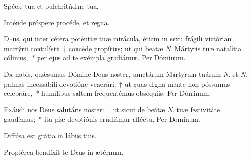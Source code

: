\documentclass[vesperale_romanum.tex]{subfiles}
\begin{document}

\newpage
\altertonus


\vel



\vv Spécie tua et pulchritúdine tua. \tpalleluia

\rr Inténde próspere procéde, et regna. \tpalleluia



\lettrine{D}{e}us, qui inter cétera poténtiæ tuæ mirácula, étiam in sexu frágili victóriam martýrii contulísti:~† concéde propítius; ut qui beatæ \textit{N.} Mártyris tuæ natalítia cólimus,~* per ejus ad te exémpla gradiámur. Per Dóminum.


\lettrine{D}{a} nobis, quǽsumus Dómine Deus noster, sanctárum Mártyrum tuárum \textit{N.} et \textit{N.} palmas incessábili devotióne venerári:~† ut quas digna mente non póssumus celebráre,~* humílibus saltem frequentémus obséquiis. Per Dóminum.


\lettrine{E}{x}áudi nos Deus salutáris noster:~† ut sicut de beátæ \textit{N.} tuæ festivitáte gaudémus;~* ita piæ devotiónis erudiámur afféctu.
Per Dóminum.


\omniapraeter %

\vv Diffúsa est grátia in lábiis tuis. \tpalleluia

\rr Proptérea bendíxit te Deus in ætérnum. \tpalleluia

\end{document}
